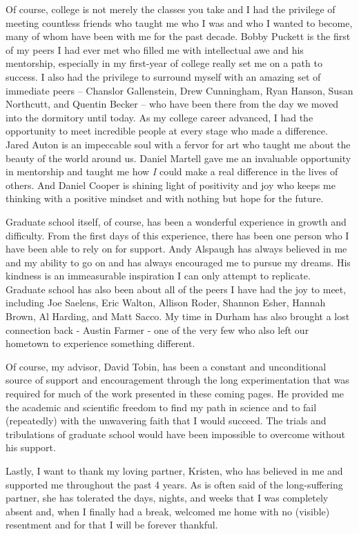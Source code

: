 \documentclass[PhD]{dukethesis2006}
\begin{document}
\begin{doublespace}
Of course, college is not merely the classes you take and I had the privilege of meeting countless friends who taught me who I was and who I wanted to become, many of whom have been with me for the past decade. Bobby Puckett is the first of my peers I had ever met who filled me with intellectual awe and his mentorship, especially in my first-year of college really set me on a path to success. I also had the privilege to surround myself with an amazing set of immediate peers -- Chanslor Gallenstein, Drew Cunningham, Ryan Hanson, Susan Northcutt, and Quentin Becker -- who have been there from the day we moved into the dormitory until today. As my college career advanced, I had the opportunity to meet incredible people at every stage who made a difference. Jared Auton is an impeccable soul with a fervor for art who taught me about the beauty of the world around us. Daniel Martell gave me an invaluable opportunity in mentorship and taught me how \textit{I} could make a real difference in the lives of others. And Daniel Cooper is shining light of positivity and joy who keeps me thinking with a positive mindset and with nothing but hope for the future.

Graduate school itself, of course, has been a wonderful experience in growth and difficulty. From the first days of this experience, there has been one person who I have been able to rely on for support. Andy Alspaugh has always believed in me and my ability to go on and has always encouraged me to pursue my dreams. His kindness is an immeasurable inspiration I can only attempt to replicate. Graduate school has also been about all of the peers I have had the joy to meet, including Joe Saelens, Eric Walton, Allison Roder, Shannon Esher, Hannah Brown, Al Harding, and Matt Sacco. My time in Durham has also brought a lost connection back - Austin Farmer - one of the very few who also left our hometown to experience something different. 

Of course, my advisor, David Tobin, has been a constant and unconditional source of support and encouragement through the long experimentation that was required for much of the work presented in these coming pages. He provided me the academic and scientific freedom to find my path in science and to fail (repeatedly) with the unwavering faith that I would succeed. The trials and tribulations of graduate school would have been impossible to overcome without his support.

Lastly, I want to thank my loving partner, Kristen, who has believed in me and supported me throughout the past 4 years. As is often said of the long-suffering partner, she has tolerated the days, nights, and weeks that I was completely absent and, when I finally had a break, welcomed me home with no (visible) resentment and for that I will be forever thankful.

\end{doublespace}
\end{document}
